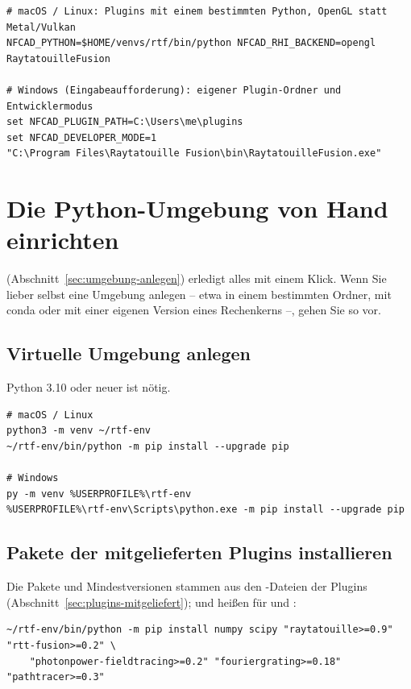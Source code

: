 \begin{lstlisting}
# macOS / Linux: Plugins mit einem bestimmten Python, OpenGL statt Metal/Vulkan
NFCAD_PYTHON=$HOME/venvs/rtf/bin/python NFCAD_RHI_BACKEND=opengl RaytatouilleFusion

# Windows (Eingabeaufforderung): eigener Plugin-Ordner und Entwicklermodus
set NFCAD_PLUGIN_PATH=C:\Users\me\plugins
set NFCAD_DEVELOPER_MODE=1
"C:\Program Files\Raytatouille Fusion\bin\RaytatouilleFusion.exe"
\end{lstlisting}

\section{Die Python-Umgebung von Hand einrichten}\label{sec:programme-python}

 (Abschnitt~\ref{sec:umgebung-anlegen}) erledigt alles mit einem Klick.
Wenn Sie lieber selbst eine Umgebung anlegen – etwa in einem bestimmten Ordner, mit conda oder
mit einer eigenen Version eines Rechenkerns –, gehen Sie so vor.

\subsection{Virtuelle Umgebung anlegen}

Python 3.10 oder neuer ist nötig.

\begin{lstlisting}
# macOS / Linux
python3 -m venv ~/rtf-env
~/rtf-env/bin/python -m pip install --upgrade pip

# Windows
py -m venv %USERPROFILE%\rtf-env
%USERPROFILE%\rtf-env\Scripts\python.exe -m pip install --upgrade pip
\end{lstlisting}

\subsection{Pakete der mitgelieferten Plugins installieren}

Die Pakete und Mindestversionen stammen aus den -Dateien der Plugins
(Abschnitt~\ref{sec:plugins-mitgeliefert});  und  heißen für
  und :

\begin{lstlisting}
~/rtf-env/bin/python -m pip install numpy scipy "raytatouille>=0.9" "rtt-fusion>=0.2" \
    "photonpower-fieldtracing>=0.2" "fouriergrating>=0.18" "pathtracer>=0.3"
\end{lstlisting}

